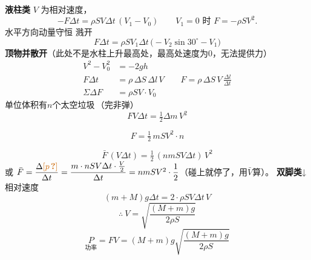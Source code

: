 \textbf{液柱类}
$V$ 为相对速度，
\[
-F\Delta t=\rho SV\Delta t\,(V_1-V_0)\qquad V_1=0\text{ 时 }F=-\rho SV^2.
\]
水平方向动量守恒
溅开
\[
F\Delta t=\rho SV_1\Delta t\,\bigl(-V_2\sin30^\circ-V_1\bigr)
\]
\textbf{顶物并散开}\quad （此处不是水柱上升最高处，最高处速度为0，无法提供力）
\begin{align*}
V^2-V_0^2&=-2gh\\
F\Delta t&=\rho\,\Delta S\,\Delta l\,V\qquad F=\rho\,\Delta S\,V\,\frac{\Delta l}{\Delta t}\\
\Sigma\Delta F&=\rho SV\cdot V_0
\end{align*}
单位体积有$n$个太空垃圾\,\quad（完非弹） %
\[
FV\Delta t=\tfrac12\Delta m\,V^2
\]
\begin{keybox}
\[
F=\tfrac12\,mSV^2\cdot n
\]
\end{keybox}
\[
\bar F\,(V\Delta t)=\tfrac12\,(nmSV\Delta t)\,V^2
\]
或 $\bar F=\dfrac{\Delta\unclear{p}}{\Delta t}=\dfrac{m\cdot nSV\Delta t\cdot\frac V2}{\Delta t}=nmSV^2\cdot\dfrac12$\quad （碰上就停了，用$\bar V$算）。
\textbf{双脚类}\quad ↓相对速度
\[
(m+M)g\Delta t=2\cdot\rho SV\Delta t\,V
\]
\[
\therefore\ V=\sqrt{\frac{(M+m)g}{2\rho S}}
\]
\[
\underset{\text{功率}}{P}=FV=(M+m)g\sqrt{\frac{(M+m)g}{2\rho S}}
\]
